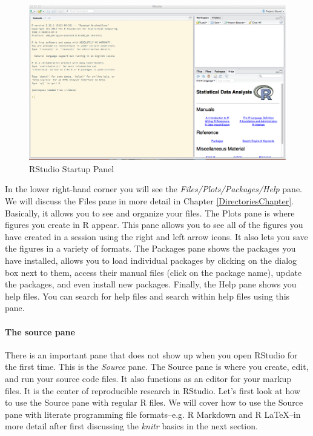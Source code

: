 \documentclass[krantz1]{krantz}
\begin{document}
\begin{figure}[ht]
    \caption{RStudio Startup Panel}
    \label{BlankMain}
    \begin{center}
    \includegraphics[width = \textwidth]{Children/Chapter3/images3/BlankMainPanel.png}
    \end{center}
\end{figure}

In the lower right-hand corner you will see the {\emph{Files/Plots/Packages/Help}} pane. We will discuss the Files pane in more detail in Chapter \ref{DirectoriesChapter}. Basically, it allows you to see and organize your files. The Plots pane is where figures you create in R appear. This pane allows you to see all of the figures you have created in a session using the right and left arrow icons. It also lets you save the figures in a variety of formats. The Packages pane shows the packages you have installed, allows you to load individual packages by clicking on the dialog box next to them, access their manual files (click on the package name), update the packages, and even install new packages. Finally, the Help pane shows you help files. You can search for help files and search within help files using this pane.  

\paragraph{The source pane}

There is an important pane that does not show up when you open RStudio for the first time. This is the {\emph{Source}} pane. The Source pane is where you create, edit, and run your source code files. It also functions as an editor for your markup files. It is the center of reproducible research in RStudio. Let's first look at how to use the Source pane with regular R files. We will cover how to use the Source pane with literate programming file formats--e.g. R Markdown and R LaTeX--in more detail after first discussing the {\emph{knitr}} basics in the next section. 
\end{document}
